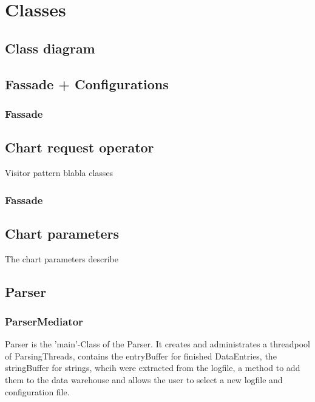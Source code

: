 \section{Classes}

\subsection{Class diagram}

\subsection{Fassade + Configurations}
\subsubsection{Fassade}


\subsection{Chart request operator}
Visitor pattern blabla
classes
\subsubsection{Fassade}

\subsection{Chart parameters}
The chart parameters describe 

\subsection{}


\subsection{Parser}

\subsubsection*{ParserMediator}
Parser is the 'main'-Class of the Parser. It creates and administrates a threadpool of ParsingThreads,
contains the entryBuffer for finished DataEntries, the stringBuffer for strings, whcih were extracted
from the logfile, a method to add them to the data warehouse
and allows the user to select a new logfile and configuration file.


